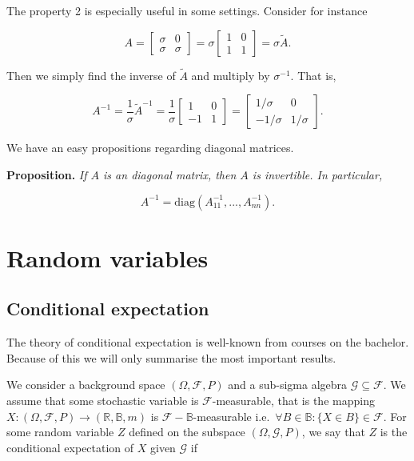\documentclass[
]{article}
\begin{document}
The property 2 is especially useful in some settings. Consider for
instance

\[
A=
\begin{bmatrix}
\sigma & 0\\
\sigma & \sigma
\end{bmatrix}=\sigma\begin{bmatrix}
1 & 0\\
1 & 1
\end{bmatrix}=\sigma \tilde{A}.
\]

Then we simply find the inverse of \(\tilde{A}\) and multiply by
\(\sigma^{-1}\). That is,

\[
A^{-1}=\frac{1}{\sigma}\tilde{A}^{-1}=\frac{1}{\sigma}
\begin{bmatrix}
1 & 0\\
-1 & 1
\end{bmatrix}=
\begin{bmatrix}
1/\sigma & 0\\
-1/\sigma & 1/\sigma
\end{bmatrix}.
\]

We have an easy propositions regarding diagonal matrices.

\textbf{Proposition.} \emph{If \(A\) is an diagonal matrix, then \(A\)
is invertible. In particular,}

\[
A^{-1}=\text{diag}(A_{11}^{-1},...,A_{nn}^{-1}).
\]

\hypertarget{random-variables}{%
\section{Random variables}\label{random-variables}}

\hypertarget{conditional-expectation}{%
\subsection{Conditional expectation}\label{conditional-expectation}}

The theory of conditional expectation is well-known from courses on the
bachelor. Because of this we will only summarise the most important
results.

We consider a background space \((\Omega,\mathcal{F},P)\) and a
sub-sigma algebra \(\mathcal{G}\subseteq \mathcal{F}\). We assume that
some stochastic variable is \(\mathcal{F}\)-measurable, that is the
mapping \(X : (\Omega,\mathcal{F},P) \to (\mathbb{R},\mathbb{B},m)\) is
\(\mathcal{F}-\mathbb{B}\)-measurable
i.e.~\(\forall B\in\mathbb{B} : \{X\in B\}\in\mathcal{F}\). For some
random variable \(Z\) defined on the subspace
\((\Omega,\mathcal{G},P)\), we say that \(Z\) is the conditional
expectation of \(X\) given \(\mathcal{G}\) if
\end{document}
